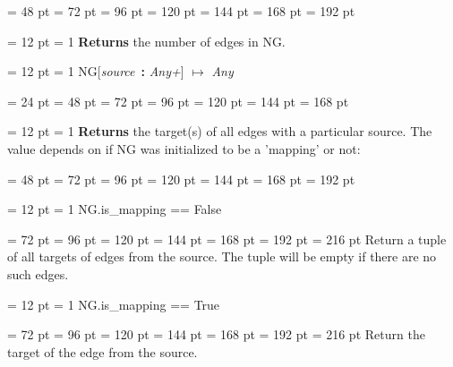 {{{{\par \noindent  \leftskip = 48 pt  \leftmargini = 72 pt  \leftmarginii = 96 pt  \leftmarginiii = 120 pt  \leftmarginiv = 144 pt  \leftmarginv = 168 pt  \leftmarginvi = 192 pt {\par \noindent
{\par \pagebreak[3.100000] \noindent \hangindent = 12 pt \hangafter = 1 
{\bf Returns \/} the number of edges in NG.
\par}
\par}
\par}
\par}
\par}
{\par \pagebreak[3.300000] \noindent \hangindent = 12 pt \hangafter = 1 
NG{[}{\em source\/}~{\bf :}  {\em Any+\/}] \(\mapsto \)  {\em Any\/}\par}
{\par \noindent  \leftskip = 24 pt  \leftmargini = 48 pt  \leftmarginii = 72 pt  \leftmarginiii = 96 pt  \leftmarginiv = 120 pt  \leftmarginv = 144 pt  \leftmarginvi = 168 pt {\par \noindent
{\par \pagebreak[3.200000] \noindent \hangindent = 12 pt \hangafter = 1 
{\bf Returns \/} the target(s) of all edges with a particular source. The value
depends on if NG was initialized to be a 'mapping' or not:{\par \noindent  \leftskip = 48 pt  \leftmargini = 72 pt  \leftmarginii = 96 pt  \leftmarginiii = 120 pt  \leftmarginiv = 144 pt  \leftmarginv = 168 pt  \leftmarginvi = 192 pt {\par \pagebreak[3.000000] \noindent \hangindent = 12 pt \hangafter = 1 
 NG.is{\_}mapping == False\par}
{\par \noindent  \leftskip = 72 pt  \leftmargini = 96 pt  \leftmarginii = 120 pt  \leftmarginiii = 144 pt  \leftmarginiv = 168 pt  \leftmarginv = 192 pt  \leftmarginvi = 216 pt  Return a tuple of all targets of edges from the source.
          The tuple will be empty if there are no such edges.\par}
{\par \pagebreak[3.000000] \noindent \hangindent = 12 pt \hangafter = 1 
 NG.is{\_}mapping == True\par}
{\par \noindent  \leftskip = 72 pt  \leftmargini = 96 pt  \leftmarginii = 120 pt  \leftmarginiii = 144 pt  \leftmarginiv = 168 pt  \leftmarginv = 192 pt  \leftmarginvi = 216 pt  Return the target of the edge from the source.
}}}}}}
